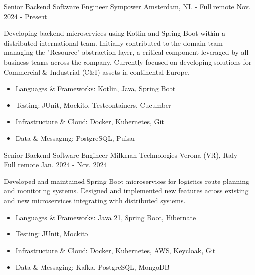 

\begin{cventries}

    \cventry
    {Senior Backend Software Engineer} %
    {Sympower} %
    {Amsterdam, NL - Full remote} %
    {Nov. 2024 - Present} %
    {
        Developing backend microservices using Kotlin and Spring Boot within a distributed international team. Initially contributed to the domain team managing the "Resource" abstraction layer, a critical component leveraged by all business teams across the company. Currently focused on developing solutions for Commercial \& Industrial (C\&I) assets in continental Europe.
        \begin{itemize}
            \item {Languages \& Frameworks: Kotlin, Java, Spring Boot}
            \item {Testing: JUnit, Mockito, Testcontainers, Cucumber}
            \item {Infrastructure \& Cloud: Docker, Kubernetes, Git}
            \item {Data \& Messaging: PostgreSQL, Pulsar}
        \end{itemize}
    }

    \cventry
    {Senior Backend Software Engineer} %
    {Milkman Technologies} %
    {Verona (VR), Italy - Full remote} %
    {Jan. 2024 - Nov. 2024} %
    {
        Developed and maintained Spring Boot microservices for logistics route planning and monitoring systems. Designed and implemented new features across existing and new microservices integrating with distributed systems.
        \begin{itemize}
            \item {Languages \& Frameworks: Java 21, Spring Boot, Hibernate}
            \item {Testing: JUnit, Mockito}
            \item {Infrastructure \& Cloud: Docker, Kubernetes, AWS, Keycloak, Git}
            \item {Data \& Messaging: Kafka, PostgreSQL, MongoDB}
        \end{itemize}
    }


\end{cventries}
